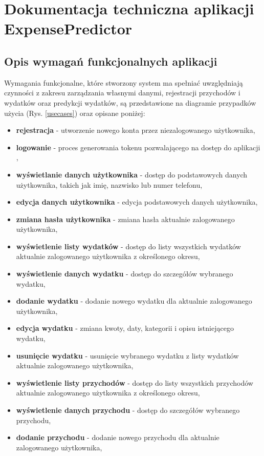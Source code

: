 \chapter{Dokumentacja techniczna aplikacji ExpensePredictor}
\section{Opis wymagań funkcjonalnych aplikacji}
Wymagania funkcjonalne, które stworzony system ma spełniać uwzględniają czynności z zakresu zarządzania własnymi danymi, rejestracji przychodów i wydatków oraz predykcji wydatków, są przedstawione na diagramie przypadków użycia (Rys. \ref{usecases}) oraz opisane poniżej:
\begin{itemize}
	\item\textbf{rejestracja} - utworzenie nowego konta przez niezalogowanego użytkownika, 
	\item\textbf{logowanie} - proces generowania tokenu pozwalającego na dostęp do aplikacji ,
	\item\textbf{wyświetlanie danych użytkownika} - dostęp do podstawowych danych użytkownika, takich jak imię, nazwisko lub numer telefonu,
	\item\textbf{edycja danych użytkownika} - edycja podstawowych danych użytkownika,
	\item\textbf{zmiana hasła użytkownika} - zmiana hasła aktualnie zalogowanego użytkownika,
	\item\textbf{wyświetlenie listy wydatków} - dostęp do listy wszystkich wydatków aktualnie zalogowanego użytkownika z określonego okresu,
	\item\textbf{wyświetlenie danych wydatku} - dostęp do szczegółów wybranego wydatku,
	\item\textbf{dodanie wydatku} - dodanie nowego wydatku dla aktualnie zalogowanego użytkownika,
	\item\textbf{edycja wydatku} - zmiana kwoty, daty, kategorii i opisu istniejącego wydatku,
	\item\textbf{usunięcie wydatku} - usunięcie wybranego wydatku z listy wydatków aktualnie zalogowanego użytkownika,
	\item\textbf{wyświetlenie listy przychodów} - dostęp do listy wszystkich przychodów aktualnie zalogowanego użytkownika z określonego okresu,
	\item\textbf{wyświetlenie danych przychodu} - dostęp do szczegółów wybranego przychodu,
	\item\textbf{dodanie przychodu} - dodanie nowego przychodu dla aktualnie zalogowanego użytkownika,

\end{itemize}
